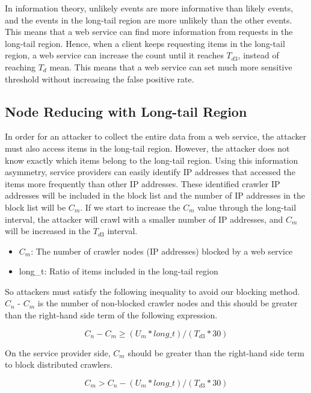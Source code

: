 \documentclass[sigconf,review]{acmart}
\begin{document}
In information theory, unlikely events are more informative than likely events, and the events in the long-tail region are more unlikely than the other events. This means that a web service can find more information from requests in the long-tail region. Hence, when a client keeps requesting items in the long-tail region, a web service can increase the count until it reaches $T_{d3}$, instead of reaching $T_d$ mean. This means that a web service can set much more sensitive threshold without increasing the false positive rate.


\subsection{Node Reducing with Long-tail Region}
In order for an attacker to collect the entire data from a web service, the attacker must also access items in the long-tail region. However, the attacker does not know exactly which items belong to the long-tail region. Using this information asymmetry, service providers can easily identify IP addresses that accessed the items more frequently than other IP addresses. These identified crawler IP addresses will be included in the block list and the number of IP addresses in the block list will be $C_m$. If we start to increase the $C_m$ value through the long-tail interval, the attacker will crawl with a smaller number of IP addresses, and $C_m$ will be increased in the $T_{d3}$ interval.

\begin{itemize}
\item $C_m$: The number of crawler nodes (IP addresses) blocked by a web service
\item long\_t: Ratio of items included in the long-tail region
\end{itemize}

So attackers must satisfy the following inequality to avoid our blocking method. $C_n$ - $C_m$ is the number of non-blocked crawler nodes and this should be greater than the right-hand side term of the following expression.

  \begin{equation}
C_n - C_m \geq (U_m * long\_t) / (T_{d3} * 30)
  \end{equation}

On the service provider side, $C_m$ should be greater than the right-hand side term to block distributed crawlers.

  \begin{equation}
C_m > C_n - (U_m * long\_t) / (T_{d3} * 30)
  \end{equation}
\end{document}
